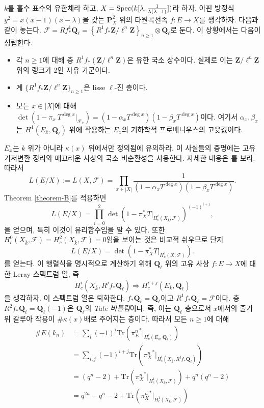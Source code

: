 \noindent
$k$를 홀수 표수의 유한체라 하고,
$X = \mathop{\mathrm{Spec}}(k[\lambda, \frac{1}{\lambda(\lambda - 1)}])$라 하자.
아핀 방정식 $y^2 = x(x - 1)(x - \lambda)$을 갖는
$\mathbf{P}^2_X$ 위의 타원곡선족 $f : E \to X$를 생각하자. 다음과 같이 놓는다.
$\mathcal{F} = Rf_*^1\mathbf{Q}_\ell =
\left\{R^1f_*\mathbf{Z}/\ell^n\mathbf{Z}\right\}_{n\geq 1} \otimes
\mathbf{Q}_\ell$로 둔다. 이 상황에서는 다음이 성립한다.
\begin{itemize}
\item 각 $n \geq 1$에 대해 층 $R^1f_*(\mathbf{Z}/\ell^n\mathbf{Z})$은
유한 국소 상수이다. 실제로 이는 $\mathbf{Z}/\ell^n\mathbf{Z}$ 위의
랭크가 2인 자유 가군이다.
\item 계 $\{R^1f_*\mathbf{Z}/\ell^n\mathbf{Z}\}_{n\geq 1}$은 lisse
$\ell$-진 층이다.
\item 모든 $x\in |X|$에 대해
$\det(1 - \pi_x\ T^{\deg x} |_{\mathcal{F}_{\bar x}}) =
(1 - \alpha_x T^{\deg x})(1 - \beta_x T^{\deg x})$이다. 여기서
$\alpha_x, \beta_x$는 $H^1(E_{\bar x}, \mathbf{Q}_\ell)$ 위에 작용하는
$E_x$의 기하학적 프로베니우스의 고윳값이다.
\end{itemize}
$E_x$는 $k$ 위가 아니라 $\kappa(x)$ 위에서만 정의됨에 유의하라.
이 사실들의 증명에는 고유 기저변환 정리와 매끄러운 사상의 국소 비순환성을
사용한다. 자세한 내용은 \cite{SGA4.5}를 보라. 따라서
$$
L(E/X) := L(X, \mathcal{F}) = \prod_{x\in |X|}
\frac{1}{(1-\alpha_xT^{\deg x})(1-\beta_xT^{\deg x })} .
$$
Theorem \ref{theorem-B}를 적용하면
$$
L(E/X) =
\prod_{i = 0}^2
\det\left(1 - \pi_X^*T |_{H_c^i(X_{\bar k}, \mathcal{F})}\right)^{(-1)^{i+1}},
$$
을 얻으며, 특히 이것이 유리함수임을 알 수 있다. 또한
$H_c^0(X_{\bar k}, \mathcal{F}) = H_c^2(X_{\bar
k}, \mathcal{F}) = 0$임을 보이는 것은 비교적 쉬우므로 단지
$$
L(E/X) = \det(1 - \pi_X^*T |_{H_c^1(X, \mathcal{F})}).
$$
를 얻는다.
이 행렬식을 명시적으로 계산하기 위해 $\mathbf{Q}_\ell$ 위의 고유 사상
$f : E \to X$에 대한 Leray 스펙트럼 열, 즉
$$
H_c^i(X_{\bar k}, R^jf_*\mathbf{Q}_\ell) \Rightarrow H_c^{i+j}(E_{\bar
k}, \mathbf{Q}_\ell)
$$
을 생각하자. 이 스펙트럼 열은 퇴화한다.
$f_*\mathbf{Q}_\ell = \mathbf{Q}_\ell$이고
$R^1f_*\mathbf{Q}_\ell = \mathcal{F}$이다. 층
$R^2f_*\mathbf{Q}_\ell = \mathbf{Q}_\ell(-1)$은 $\mathbf{Q}_\ell$의
{\it Tate 비틀림}이다. 즉, 이는 $\mathbf{Q}_\ell$ 층으로서
$\bar x$에서의 줄기 위 갈루아 작용이 $\#\kappa(x)$배로 주어지는 층이다.
따라서 모든 $n\geq 1$에 대해
\begin{align*}
\# E(k_n)
& =
\sum\nolimits_i (-1)^i
\text{Tr}({\pi_E^n}^* |_{H_c^i(E_{\bar k}, \mathbf{Q}_\ell)}) \\
& =
\sum\nolimits_{i, j} (-1)^{i+j}
\text{Tr}({\pi^n_X}^* |_{H_c^i(X_{\bar k}, R^jf_*\mathbf{Q}_\ell)}) \\
& =
(q^n - 2) +
\text{Tr}({\pi_X^n}^* |_{H_c^1(X_{\bar k}, \mathcal{F})}) + q^n(q^n - 2) \\
& =
q^{2n} - q^n - 2 +
\text{Tr}({\pi_X^n}^* |_{H_c^1(X_{\bar k}, \mathcal{F})})
\end{align*}
